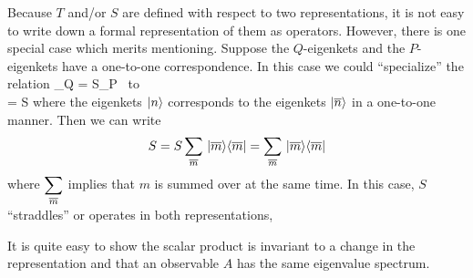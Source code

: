 Because $T$ and/or $S$ are defined with respect to two representations, it is not easy to write down a formal representation of them as operators. However, there is one special case which merits mentioning. 
Suppose the $Q$-eigenkets and the $P$-eigenkets have a one-to-one correspondence. In this case we could ``specialize'' the relation
\bearray
{}_Q = S_P \mbox{ to } \\
 = S
\eearray
where the eigenkets $|n\rangle$ corresponds to the eigenkets $|\overline{n}\rangle$ in a one-to-one manner. Then we can write
$$S = S\sum_{\overline{m}}\, |\overline{m}\rangle\langle \overline{m}| = \sum_{\overline{m}}\, |\overline{m}\rangle \langle \overline{m}|$$ where $\displaystyle \sum_{\overline{m}}$ implies that $m$ is summed over at the same time. In this case, $S$
``straddles'' or operates in both representations, 

It is quite easy to show the scalar product is invariant to a change in the representation and that an observable $A$ has the same eigenvalue spectrum.